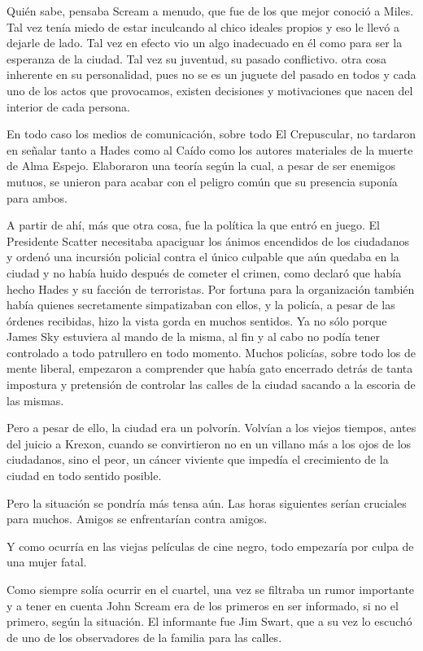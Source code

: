 Quién sabe, pensaba Scream a menudo, que fue de los que mejor conoció a Miles. Tal vez tenía miedo de estar inculcando al chico ideales propios y eso le llevó a dejarle de lado. Tal vez en efecto vio un algo inadecuado en él como para ser la esperanza de la ciudad. Tal vez su juventud, su pasado conflictivo.  otra cosa inherente en su personalidad, pues no se es un juguete del pasado en todos y cada uno de los actos que provocamos, existen decisiones y motivaciones que nacen del interior de cada persona.

En todo caso los medios de comunicación, sobre todo El Crepuscular, no tardaron en señalar tanto a Hades como al Caído como los autores materiales de la muerte de Alma Espejo. Elaboraron una teoría según la cual, a pesar de ser enemigos mutuos, se unieron para acabar con el peligro común que su presencia suponía para ambos.

A partir de ahí, más que otra cosa, fue la política la que entró en juego. El Presidente Scatter necesitaba apaciguar los ánimos encendidos de los ciudadanos y ordenó una incursión policial contra el único culpable que aún quedaba en la ciudad y no había huido después de cometer el crimen, como declaró que había hecho Hades y su facción de terroristas. Por fortuna para la organización también había quienes secretamente simpatizaban con ellos, y la policía, a pesar de las órdenes recibidas, hizo la vista gorda en muchos sentidos. Ya no sólo porque James Sky estuviera al mando de la misma, al fin y al cabo no podía tener controlado a todo patrullero en todo momento. Muchos policías, sobre todo los de mente liberal, empezaron a comprender que había gato encerrado detrás de tanta impostura y pretensión de controlar las calles de la ciudad sacando a la escoria de las mismas.

Pero a pesar de ello, la ciudad era un polvorín. Volvían a los viejos tiempos, antes del juicio a Krexon, cuando se convirtieron no en un villano más a los ojos de los ciudadanos, sino el peor, un cáncer viviente que impedía el crecimiento de la ciudad en todo sentido posible.

Pero la situación se pondría más tensa aún. Las horas siguientes serían cruciales para muchos. Amigos se enfrentarían contra amigos.

Y como ocurría en las viejas películas de cine negro, todo empezaría por culpa de una mujer fatal.

\parbreak
Como siempre solía ocurrir en el cuartel, una vez se filtraba un rumor importante y a tener en cuenta John Scream era de los primeros en ser informado, si no el primero, según la situación. El informante fue Jim Swart, que a su vez lo escuchó de uno de los observadores de la familia para  las calles.

